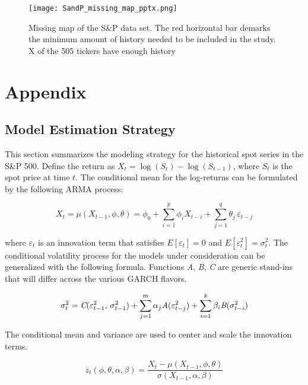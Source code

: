 \documentclass[12pt]{article}
\begin{document}
\begin{figure}[!ht]
    \centering
    \texttt{[image: SandP\_missing\_map\_pptx.png]}
    \caption{Missing map of the S\&P data set. The red horizontal bar demarks the minimum amount of history needed to be included in the study. X of the 505 tickers have enough history}
    \label{fig:SandP_missing_map}
\end{figure}


\section{Appendix}

\subsection{Model Estimation Strategy} \label{sec:ModelEstimationStrategy}

This section summarizes the modeling strategy for the historical spot series in the S\&P 500. Define the return as $X_{t} = \log \left(S_{t}\right) - \log\left(S_{t-1}\right)$, where $S_{t}$ is the spot price at time $t$. The conditional mean for the log-returns can be formulated by the following ARMA process:

\begin{equation} \label{eqn:marginalModel}
    X_{t} = \mu(X_{t-1}, \phi, \theta) =  \phi_{0} + \sum_{i=1}^{p} \phi_{i} X_{t-i} + \sum_{j=1}^{q} \theta_{j} \, \varepsilon_{t - j}
\end{equation}

where $\varepsilon_{t}$ is an innovation term that satisfies $E[\varepsilon_{t}] = 0$ and $E[\varepsilon^{2}_{t}] = \sigma^{2}_{t}$. The conditional volatility process for the models under consideration can be generalized with the following formula. Functions \emph{A}, \emph{B}, \emph{C} are generic stand-ins that will differ across the various GARCH flavors. 

\begin{equation}
    \sigma^{2}_{t} = \emph{C}(\varepsilon^{2}_{t-1}, \, \sigma^{2}_{t-1}) + \sum_{j=1}^{m} \alpha_{j} \emph{A}(\varepsilon^{2}_{t - j}) + \sum_{i=1}^{k} \beta_{i} \emph{B}(\sigma^{2}_{t - i})
\end{equation}

The conditional mean and variance are used to center and scale the innovation terms.

\begin{equation}
    z_{t}(\phi, \theta, \alpha, \beta) = \frac{X_{t} - \mu(X_{t-1}, \phi, \theta)}{\sigma(X_{t-1}, \alpha, \beta)}
\end{equation}
\end{document}
